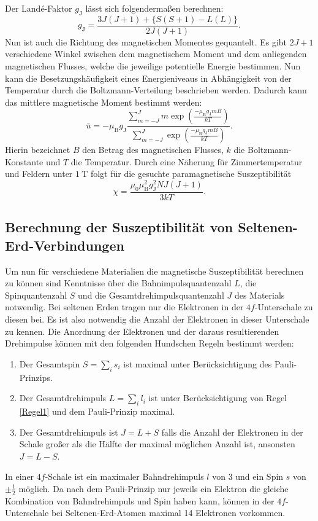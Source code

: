 Der Landé-Faktor $g_\text{J}$ lässt sich folgendermaßen berechnen:
\begin{equation}
	g_\text{J}=\frac{3 J(J+1) + \{S(S+1) - L(L)\}}{2 J(J+1)}\text{.}
\end{equation}
Nun ist auch die Richtung des magnetischen Momentes gequantelt. Es gibt $2 J +1$ verschiedene Winkel zwischen dem magnetischem Moment und dem anliegenden magnetischen Flusses, welche die jeweilige potentielle Energie bestimmen. Nun kann die Besetzungshäufigkeit eines Energieniveaus in Abhängigkeit von der Temperatur durch die Boltzmann-Verteilung beschrieben werden. Dadurch kann das mittlere magnetische Moment bestimmt werden:
\begin{equation}
	\bar{u}=-\mu_\text{B} g_\text{J} \frac{\sum\limits_{m=-J}^{J} m \exp\left(\frac{-\mu_\text{B} g_\text{J} m B}{k T}\right)}{\sum\limits_{m=-J}^{J} \exp\left(\frac{-\mu_\text{B} g_\text{J} m B}{k T}\right)}\text{.}
\end{equation}
Hierin bezeichnet $B$ den Betrag des magnetischen Flusses, $k$ die Boltzmann-Konstante und $T$ die Temperatur.  Durch eine Näherung für Zimmertemperatur und Feldern unter $\SI{1}{\tesla}$ folgt für die gesuchte paramagnetische Suszeptibilität
\begin{equation}
	\chi = \frac{\mu_0 \mu_\text{B}^2 g_\text{J}^2 N J(J+1)}{3 k T}\text{.}
\end{equation}


\subsection{Berechnung der Suszeptibilität von Seltenen-Erd-Verbindungen}
Um nun für verschiedene Materialien die magnetische Suszeptibilität berechnen zu können sind Kenntnisse über die Bahnimpulsquantenzahl $L$, die Spinquantenzahl $S$ und die Gesamtdrehimpulsquantenzahl $J$ des Materials notwendig. Bei seltenen Erden tragen nur die Elektronen in der $4f$-Unterschale zu diesen bei. Es ist also notwendig die Anzahl der Elektronen in dieser Unterschale zu kennen. Die Anordnung der Elektronen und der daraus resultierenden Drehimpulse können mit den folgenden Hundschen Regeln bestimmt werden:
\begin{enumerate}
	\item Der Gesamtspin $S=\sum_{i} s_i$ ist maximal unter Berücksichtigung des Pauli-Prinzips. \label{Regel1}
	\item Der Gesamtdrehimpuls $L=\sum_i l_i$ ist unter Berücksichtigung von Regel \ref{Regel1} und dem Pauli-Prinzip maximal. \label{Regel2}
	\item Der Gesamtdrehimpuls ist $J=L+S$ falls die Anzahl der Elektronen in der Schale großer als die Hälfte der maximal möglichen Anzahl ist, ansonsten $J=L-S$. \label{Regel3}
\end{enumerate}
In einer $4f$-Schale ist ein maximaler Bahndrehimpuls $l$ von 3 und ein Spin $s$ von $\pm \frac{1}{2}$ möglich. Da nach dem Pauli-Prinzip nur jeweils ein Elektron die gleiche Kombination von Bahndrehimpuls und Spin haben kann, können in der $4f$-Unterschale bei Seltenen-Erd-Atomen maximal 14 Elektronen vorkommen.